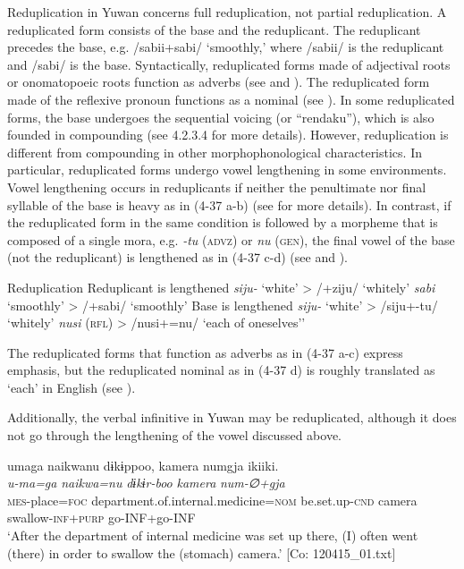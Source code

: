 Reduplication in Yuwan concerns full reduplication, not partial reduplication. A reduplicated form consists of the base and the reduplicant. The reduplicant precedes the base, e.g. /sabii+sabi/ ‘smoothly,’ where /sabii/ is the reduplicant and /sabi/ is the base. Syntactically, reduplicated forms made of adjectival roots or onomatopoeic roots function as adverbs (see  and ). The reduplicated form made of the reflexive pronoun functions as a nominal (see ). In some reduplicated forms, the base undergoes the sequential voicing (or “rendaku”), which is also founded in compounding (see 4.2.3.4 for more details). However, reduplication is different from compounding in other morphophonological characteristics. In particular, reduplicated forms undergo vowel lengthening in some environments. Vowel lengthening occurs in reduplicants if neither the penultimate nor final syllable of the base is heavy as in (4-37 a-b) (see  for more details). In contrast, if the reduplicated form in the same condition is followed by a morpheme that is composed of a single mora, e.g. \textit{{}-tu} (\textsc{advz}) or \textit{nu} (\textsc{gen}), the final vowel of the base (not the reduplicant) is lengthened as in (4-37 c-d) (see  and ).

\ea  Reduplication \label{ex:4.37}
 Reduplicant is lengthened
  \ea  \textit{siju-}  ‘white’  >  /+ziju/  ‘whitely’
  \ex  \textit{sabi}  ‘smoothly’  >  /+sabi/  ‘smoothly’
 Base is lengthened
  \ex  \textit{siju-}  ‘white’  >  /siju+-tu/  ‘whitely’
  \ex  \textit{nusi}  (\textsc{rfl})  >  /nusi+=nu/  ‘each of oneselves’’
  \z
\z

The reduplicated forms that function as adverbs as in (4-37 a-c) express emphasis, but the reduplicated nominal as in (4-37 d) is roughly translated as ‘each’ in English (see ).

  Additionally, the verbal infinitive in Yuwan may be reduplicated, although it does not go through the lengthening of the vowel discussed above.

\ea  \label{ex:4.38}
\ea %
\glll    umaga  naikwanu  dɨkɨppoo,   {\textbar}kamera{\textbar}  numgja  ikiiki.\\
      \textit{u-ma=ga}  \textit{naikwa=nu}  \textit{dɨkɨr-boo}    \textit{kamera}  \textit{num-∅+gja}  \textit{}\\
      \textsc{mes}-place=\textsc{foc}  department.of.internal.medicine=\textsc{nom}  be.set.up-\textsc{cnd}  camera  swallow-\textsc{inf}+\textsc{purp}  go-INF+go-INF      \\
      \glt       ‘After the department of internal medicine was set up there, (I) often went (there) in order to swallow the (stomach) camera.’ [Co: 120415\_01.txt]

